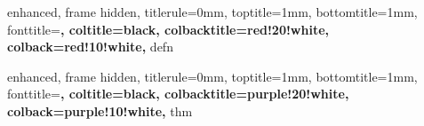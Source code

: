 
{
    enhanced,
    frame hidden,
    titlerule=0mm,
    toptitle=1mm,
    bottomtitle=1mm,
    fonttitle=\bfseries\large,
    coltitle=black,
    colbacktitle=red!20!white,
    colback=red!10!white,
}{defn}



{
    enhanced,
    frame hidden,
    titlerule=0mm,
    toptitle=1mm,
    bottomtitle=1mm,
    fonttitle=\bfseries\large,
    coltitle=black,
    colbacktitle=purple!20!white,
    colback=purple!10!white,
}{thm}



\newenvironment{thmpf}{
	{\noindent{\it \textbf{Proof:}}}
	\tcolorbox[blanker,breakable,left=5mm,parbox=false,
    before upper={\parindent0pt},
    after skip=10pt,
	borderline west={1mm}{0pt}{purple!20!white}]
}{
    \textcolor{purple!20!white}{\hbox{}\nobreak\hfill$\blacksquare$}
    \endtcolorbox
}

